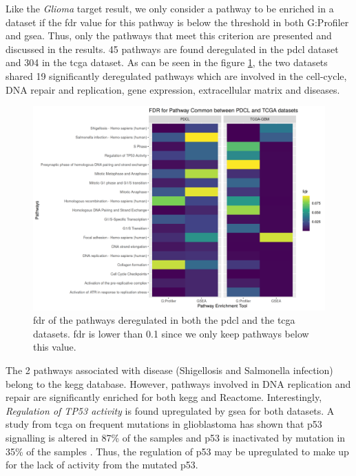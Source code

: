 Like the \textit{Glioma} target result, we only consider a pathway to be enriched in a dataset if the \acrshort{fdr} value for this pathway is below the threshold in both G:Profiler and \acrshort{gsea}.
Thus, only the pathways that meet this criterion are presented and discussed in the results.
45 pathways are found deregulated in the \acrshort{pdcl} dataset and 304 in the \acrshort{tcga} dataset.
As can be seen in the figure \ref{fig:heatmap-fdr-global-tcga}, the two datasets shared 19 significantly deregulated pathways which are involved in the cell-cycle, DNA repair and replication, gene expression, extracellular matrix and diseases.
\begin{figure}
    \includegraphics[width=\textwidth]{img/heatmap-fdr-global-tcga}
    \caption{
        \acrfull{fdr} of the pathways deregulated in both the \acrshort{pdcl} and the \acrshort{tcga} datasets.
        \acrshort{fdr} is lower than 0.1 since we only keep pathways below this value.
    }
    \label{fig:heatmap-fdr-global-tcga}
\end{figure}
The 2 pathways associated with disease (Shigellosis and Salmonella infection) belong to the \acrshort{kegg} database.
However, pathways involved in DNA replication and repair are significantly enriched for both \acrshort{kegg} and Reactome.
Interestingly, \textit{Regulation of TP53 activity} is found upregulated by \acrshort{gsea} for both datasets.
A study from \acrshort{tcga} on frequent mutations in glioblastoma has shown that p53 signalling is altered in 87\% of the samples and p53 is inactivated by mutation in 35\% of the samples \cite*{McLendon2008}.
Thus, the regulation of p53 may be upregulated to make up for the lack of activity from the mutated p53.

